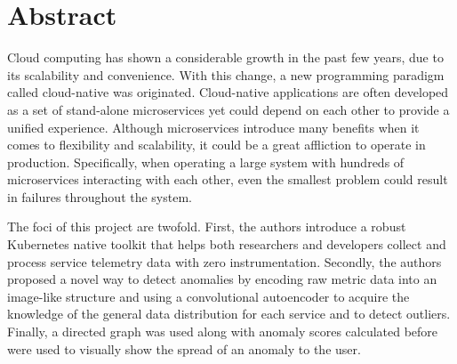 \chapter*{Abstract}

Cloud computing has shown a considerable growth in the past few years, due to its scalability and convenience. With this change, a new programming paradigm called cloud-native was originated. Cloud-native applications are often developed as a set of stand-alone microservices yet could depend on each other to provide a unified experience. Although microservices introduce many benefits when it comes to flexibility and scalability, it could be a great affliction to operate in production. Specifically, when operating a large system with hundreds of microservices interacting with each other, even the smallest problem could result in failures throughout the system.



The foci of this project are twofold. First, the authors introduce a robust Kubernetes native toolkit that helps both researchers and developers collect and process service telemetry data with zero instrumentation. Secondly, the authors proposed a novel way to detect anomalies by encoding raw metric data into an image-like structure and using a convolutional autoencoder to acquire the knowledge of the general data distribution for each service and to detect outliers. Finally, a directed graph was used along with anomaly scores calculated before were used to visually show the spread of an anomaly to the user. 

